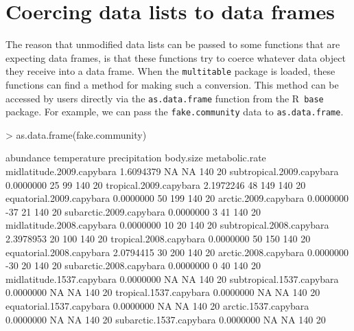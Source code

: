 \documentclass{article}
\newcommand{\R}{{\sf R}}
\newcommand{\code}[1]{\texttt{#1}}
\numberwithin{exercise}{section}
\begin{document}
\section{Coercing data lists to data frames}

The reason that unmodified data lists can be passed to some functions that are expecting data frames, is that these functions try to coerce whatever data object they receive into a data frame.  When the \code{multitable} package is loaded, these functions can find a method for making such a conversion.  This method can be accessed by users directly via the \code{as.data.frame} function from the \R\ \code{base} package.  For example, we can pass the \code{fake.community} data to \code{as.data.frame}.
\begin{Schunk}
\begin{Sinput}
> as.data.frame(fake.community)
\end{Sinput}
\begin{Soutput}
                          abundance temperature precipitation body.size metabolic.rate
midlatitude.2009.capybara 1.6094379          NA            NA       140             20
subtropical.2009.capybara 0.0000000          25            99       140             20
tropical.2009.capybara    2.1972246          48           149       140             20
equatorial.2009.capybara  0.0000000          50           199       140             20
arctic.2009.capybara      0.0000000         -37            21       140             20
subarctic.2009.capybara   0.0000000           3            41       140             20
midlatitude.2008.capybara 0.0000000          10            20       140             20
subtropical.2008.capybara 2.3978953          20           100       140             20
tropical.2008.capybara    0.0000000          50           150       140             20
equatorial.2008.capybara  2.0794415          30           200       140             20
arctic.2008.capybara      0.0000000         -30            20       140             20
subarctic.2008.capybara   0.0000000           0            40       140             20
midlatitude.1537.capybara 0.0000000          NA            NA       140             20
subtropical.1537.capybara 0.0000000          NA            NA       140             20
tropical.1537.capybara    0.0000000          NA            NA       140             20
equatorial.1537.capybara  0.0000000          NA            NA       140             20
arctic.1537.capybara      0.0000000          NA            NA       140             20
subarctic.1537.capybara   0.0000000          NA            NA       140             20

\end{Soutput}
\end{Schunk}
\end{document}
